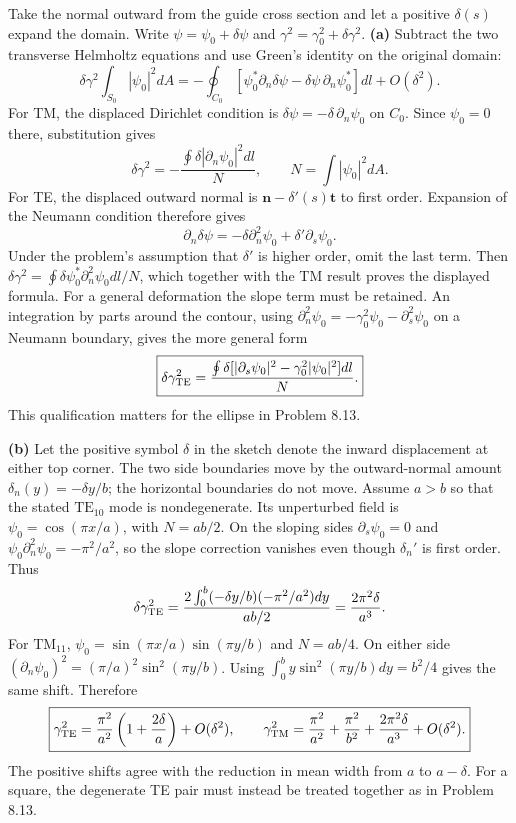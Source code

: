 Take the normal outward from the guide cross section and let a positive
$\delta(s)$ expand the domain.  Write
$\psi=\psi_0+\delta\psi$ and
$\gamma^2=\gamma_0^2+\delta\gamma^2$.
\textbf{(a)} Subtract the two transverse Helmholtz equations and
use Green's identity on the original domain:
\[
\delta\gamma^2\int_{S_0}|\psi_0|^2dA
=-\oint_{C_0}\left[\psi_0^*\partial_n\delta\psi
-\delta\psi\,\partial_n\psi_0^*\right]dl+O(\delta^2).
\]
For TM, the displaced Dirichlet condition is
$\delta\psi=-\delta\,\partial_n\psi_0$ on $C_0$.
Since $\psi_0=0$ there, substitution gives
\[
\delta\gamma^2=-\frac{\oint\delta|\partial_n\psi_0|^2dl}{N},
\qquad N=\int|\psi_0|^2dA.
\]
For TE, the displaced outward normal is
$\mathbf n-\delta'(s)\mathbf t$ to first order.  Expansion of the
Neumann condition therefore gives
\[
\partial_n\delta\psi=-\delta\partial_n^2\psi_0
+\delta'\partial_s\psi_0.
\]
Under the problem's assumption that $\delta'$ is higher order, omit
the last term.  Then
$\delta\gamma^2=\oint\delta\psi_0^*\partial_n^2\psi_0dl/N$,
which together with the TM result proves the displayed formula.
For a general deformation the slope term must be retained.  An
integration by parts around the contour, using
$\partial_n^2\psi_0=-\gamma_0^2\psi_0-\partial_s^2\psi_0$
on a Neumann boundary, gives the more general form
\[
\boxed{\delta\gamma_{\rm TE}^2=
\frac{\oint\delta[|\partial_s\psi_0|^2-\gamma_0^2|\psi_0|^2]dl}{N}.}
\]
This qualification matters for the ellipse in Problem 8.13.

\textbf{(b)} Let the positive symbol $\delta$ in the sketch denote
the inward displacement at either top corner.  The two side
boundaries move by the outward-normal amount
$\delta_n(y)=-\delta y/b$; the horizontal boundaries do not move.
Assume $a>b$ so that the stated $\mathrm{TE}_{10}$ mode is
nondegenerate.  Its unperturbed field is
$\psi_0=\cos(\pi x/a)$, with $N=ab/2$.
On the sloping sides $\partial_s\psi_0=0$ and
$\psi_0\partial_n^2\psi_0=-\pi^2/a^2$, so the slope correction
vanishes even though $\delta_n'$ is first order.  Thus
\[
\delta\gamma_{\rm TE}^2
=\frac{2\int_0^b(-\delta y/b)(-\pi^2/a^2)dy}{ab/2}
=\frac{2\pi^2\delta}{a^3}.
\]
For $\mathrm{TM}_{11}$,
$\psi_0=\sin(\pi x/a)\sin(\pi y/b)$ and $N=ab/4$.
On either side $(\partial_n\psi_0)^2=(\pi/a)^2\sin^2(\pi y/b)$.
Using $\int_0^by\sin^2(\pi y/b)dy=b^2/4$ gives the same shift.
Therefore
\[
\boxed{\gamma_{\rm TE}^2=\frac{\pi^2}{a^2}
\left(1+\frac{2\delta}{a}\right)+O(\delta^2),\qquad
\gamma_{\rm TM}^2=\frac{\pi^2}{a^2}+\frac{\pi^2}{b^2}
+\frac{2\pi^2\delta}{a^3}+O(\delta^2).}
\]
The positive shifts agree with the reduction in mean width from $a$
to $a-\delta$.  For a square, the degenerate TE pair must instead
be treated together as in Problem 8.13.


